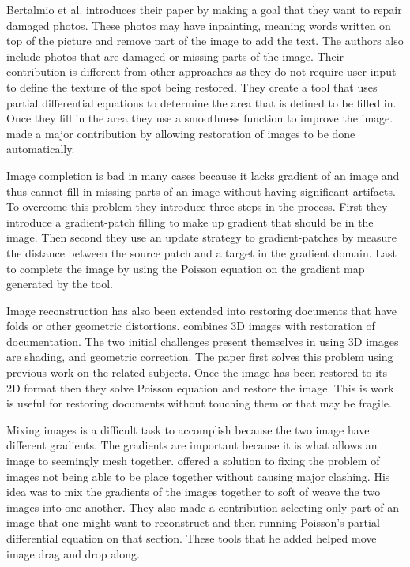 \documentclass[10pt,twopage]{acmsiggraph}
\begin{document}
Bertalmio et al. introduces their paper by making a goal that they want to repair damaged photos. These photos may have inpainting, meaning words written on top of the picture and remove part of the image to add the text. The authors also include photos that are damaged or missing parts of the image. Their contribution is different from other approaches as they do not require user input to define the texture of the spot being restored. They create a tool that uses partial differential equations to determine the area that is defined to be filled in. Once they fill in the area they use a smoothness function to improve the image. \cite{Bertalmio} made a major contribution by allowing restoration of images to be done automatically.

Image completion is bad in many cases because it lacks gradient of an image and thus cannot fill in missing parts of an image without having significant artifacts. To overcome this problem they introduce three steps in the process. First they introduce a gradient-patch filling to make up gradient that should be in the image. Then second they use an update strategy to gradient-patches by measure the distance between the source patch and a target in the gradient domain. Last to complete the image by using the Poisson equation on the gradient map generated by the tool.\cite{Shen} \cite{Ballester}

Image reconstruction has also been extended into restoring documents that have folds or other geometric distortions. \cite{sun} combines 3D images with restoration of documentation. The two initial challenges present themselves in using 3D images are shading, and geometric correction. The paper first solves this problem using previous work on the related subjects. Once the image has been restored to its 2D format then they solve Poisson equation and restore the image. This is work is useful for restoring documents without touching them or that may be fragile.

Mixing images is a difficult task to accomplish because the two image have different gradients. The gradients are important because it is what allows an image to seemingly mesh together. \cite{Perez} offered a solution to fixing the problem of images not being able to be place together without causing major clashing. His idea was to mix the gradients of the images together to soft of weave the two images into one another. They also made a contribution selecting only part of an image that one might want to reconstruct and then running Poisson's partial differential equation on that section. These tools that he added helped move image drag and drop along.
\end{document}
